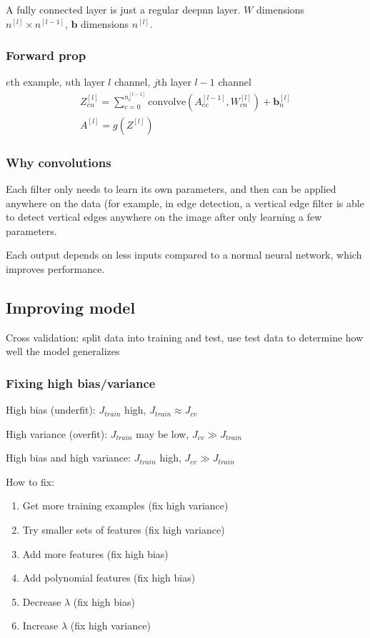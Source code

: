 \documentclass[12pt]{article}
\begin{document}
A fully connected layer is just a regular deepnn layer. $W$ dimensions $n^{[l]} \times n^{[l-1]}$,
$\bm b$ dimensions $n^{[l]}$.

\subsubsection{Forward prop}

$e$th example, $n$th layer $l$ channel, $j$th layer $l-1$ channel
\begin{gather*}
    Z^{[l]}_{en} = \sum_{c=0}^{n_c^{[l-1]}}\text{convolve}(A^{[l-1]}_{ec},W^{[l]}_{cn}) + \bm b^{[l]}_n\\
    A^{[l]} = g(Z^{[l]})
\end{gather*}

\subsubsection{Why convolutions}

Each filter only needs to learn its own parameters, and then can be applied anywhere on the
data (for example, in edge detection, a vertical edge filter is able to detect vertical edges
anywhere on the image after only learning a few parameters.

Each output depends on less inputs compared to a normal neural network, which improves
performance.

\subsection{Improving model}

Cross validation: split data into training and test, use test data to determine how well the model generalizes

\subsubsection{Fixing high bias/variance}

High bias (underfit): $J_{train}$ high, $J_{train} \approx J_{cv}$

High variance (overfit): $J_{train}$ may be low, $J_{cv} \gg J_{train}$

High bias and high variance: $J_{train}$ high, $J_{cv} \gg J_{train}$

How to fix:

\begin{enumerate}
\item Get more training examples (fix high variance)
\item Try smaller sets of features (fix high variance)
\item Add more features (fix high bias)
\item Add polynomial features (fix high bias)
\item Decrease $\lambda$ (fix high bias)
\item Increase $\lambda$ (fix high variance)
\end{enumerate}
\end{document}
